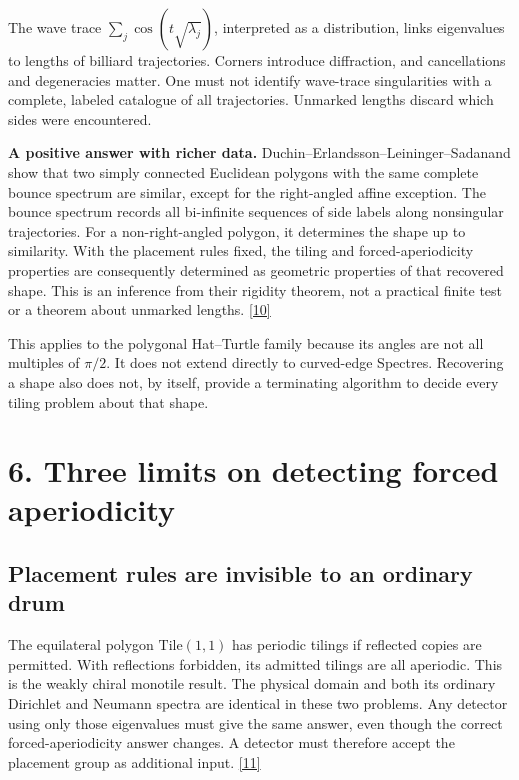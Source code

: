 \documentclass[11pt]{article}
\begin{document}
The wave trace \(\sum_j\cos(t\sqrt{\lambda_j})\), interpreted as a distribution, links eigenvalues to lengths of billiard trajectories. Corners introduce diffraction, and cancellations and degeneracies matter. One must not identify wave-trace singularities with a complete, labeled catalogue of all trajectories. Unmarked lengths discard which sides were encountered.



\textbf{A positive answer with richer data.} Duchin--Erlandsson--Leininger--Sadanand show that two simply connected Euclidean polygons with the same complete bounce spectrum are similar, except for the right-angled affine exception. The bounce spectrum records all bi-infinite sequences of side labels along nonsingular trajectories. For a non-right-angled polygon, it determines the shape up to similarity. With the placement rules fixed, the tiling and forced-aperiodicity properties are consequently determined as geometric properties of that recovered shape. This is an inference from their rigidity theorem, not a practical finite test or a theorem about unmarked lengths. \hyperlink{ref10}{[10]}



This applies to the polygonal Hat--Turtle family because its angles are not all multiples of \(\pi/2\). It does not extend directly to curved-edge Spectres. Recovering a shape also does not, by itself, provide a terminating algorithm to decide every tiling problem about that shape.




\section*{6. Three limits on detecting forced aperiodicity}


\subsection*{Placement rules are invisible to an ordinary drum}


The equilateral polygon \(\mathrm{Tile}(1,1)\) has periodic tilings if reflected copies are permitted. With reflections forbidden, its admitted tilings are all aperiodic. This is the weakly chiral monotile result. The physical domain and both its ordinary Dirichlet and Neumann spectra are identical in these two problems. Any detector using only those eigenvalues must give the same answer, even though the correct forced-aperiodicity answer changes. A detector must therefore accept the placement group as additional input. \hyperlink{ref11}{[11]}
\end{document}
